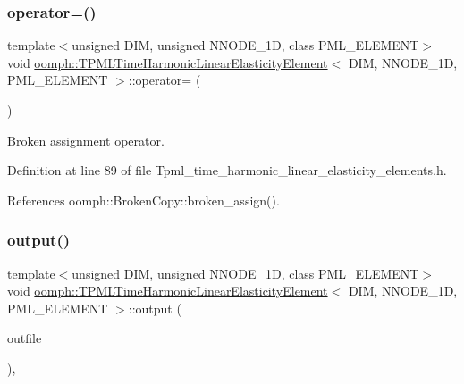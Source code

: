 \subsubsection{\texorpdfstring{operator=()}{operator=()}}
{\footnotesize\ttfamily template$<$unsigned D\+IM, unsigned N\+N\+O\+D\+E\+\_\+1D, class P\+M\+L\+\_\+\+E\+L\+E\+M\+E\+NT$>$ \\
void \hyperlink{classoomph_1_1TPMLTimeHarmonicLinearElasticityElement}{oomph\+::\+T\+P\+M\+L\+Time\+Harmonic\+Linear\+Elasticity\+Element}$<$ D\+IM, N\+N\+O\+D\+E\+\_\+1D, P\+M\+L\+\_\+\+E\+L\+E\+M\+E\+NT $>$\+::operator= (\begin{DoxyParamCaption}\item[{const \hyperlink{classoomph_1_1TPMLTimeHarmonicLinearElasticityElement}{T\+P\+M\+L\+Time\+Harmonic\+Linear\+Elasticity\+Element}$<$ D\+IM, N\+N\+O\+D\+E\+\_\+1D, P\+M\+L\+\_\+\+E\+L\+E\+M\+E\+NT $>$ \&}]{ }\end{DoxyParamCaption})\hspace{0.3cm}{\ttfamily [inline]}}



Broken assignment operator. 



Definition at line 89 of file Tpml\+\_\+time\+\_\+harmonic\+\_\+linear\+\_\+elasticity\+\_\+elements.\+h.



References oomph\+::\+Broken\+Copy\+::broken\+\_\+assign().

\mbox{\label{classoomph_1_1TPMLTimeHarmonicLinearElasticityElement_a9206d6dda1bade58f9cd4dba3e6c645d}} 
\subsubsection{\texorpdfstring{output()}{output()}\hspace{0.1cm}{\footnotesize\ttfamily [1/4]}}
{\footnotesize\ttfamily template$<$unsigned D\+IM, unsigned N\+N\+O\+D\+E\+\_\+1D, class P\+M\+L\+\_\+\+E\+L\+E\+M\+E\+NT$>$ \\
void \hyperlink{classoomph_1_1TPMLTimeHarmonicLinearElasticityElement}{oomph\+::\+T\+P\+M\+L\+Time\+Harmonic\+Linear\+Elasticity\+Element}$<$ D\+IM, N\+N\+O\+D\+E\+\_\+1D, P\+M\+L\+\_\+\+E\+L\+E\+M\+E\+NT $>$\+::output (\begin{DoxyParamCaption}\item[{std\+::ostream \&}]{outfile }\end{DoxyParamCaption})\hspace{0.3cm}{\ttfamily [inline]}, {\ttfamily [virtual]}}



